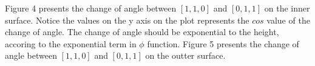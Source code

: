\documentclass[a4paper,12pt]{article} %
\begin{document}
Figure 4 presents the change of angle between $[1,1,0]$ and $[0,1,1]$ on the inner surface. Notice the values on the y axis on the plot 
represents the $cos$ value of the change of angle. The change of angle should be exponential to the height, accoring to the exponential term in $\phi$ function.
Figure 5 presents the change of angle between $[1,1,0]$ and $[0,1,1]$ on the outter surface.
     
\end{document}
